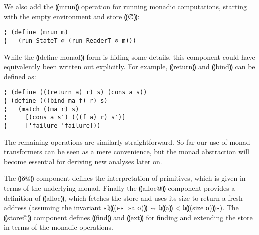 We also add the ⸨mrun⸩ operation for running monadic computations, starting
with the empty environment and store ⸨∅⸩:
\begin{lstlisting}
¦ (define (mrun m)
¦   (run-StateT ∅ (run-ReaderT ∅ m)))
\end{lstlisting}
While the ⸨define-monad⸩ form is hiding some details, this component could have
equivalently been written out explicitly. For example, ⸨return⸩ and ⸨bind⸩ can
be defined as:
\begin{lstlisting}
¦ (define (((return a) r) s) (cons a s))
¦ (define (((bind ma f) r) s)
¦   (match ((ma r) s)
¦     [(cons a s′) (((f a) r) s′)]
¦     ['failure 'failure]))
\end{lstlisting}
The remaining operations are similarly straightforward.  So far our use of
monad transformers can be seen as a mere convenience, but the monad abstraction
will become essential for deriving new analyses later on.

The ⸨δ@⸩ component defines the interpretation of primitives, which is given in
terms of the underlying monad.  Finally the ⸨alloc@⸩ component provides a
definition of ⸨alloc⸩, which fetches the store and uses its size to return a
fresh address (assuming the invariant «𝔥⸨(∈«\ »a σ)⸩ ⇔ 𝔥⸨a⸩ < 𝔥⸨(size σ)⸩»).
The ⸨store@⸩ component defines ⸨find⸩ and ⸨ext⸩ for finding and extending the
store in terms of the monadic operations.

